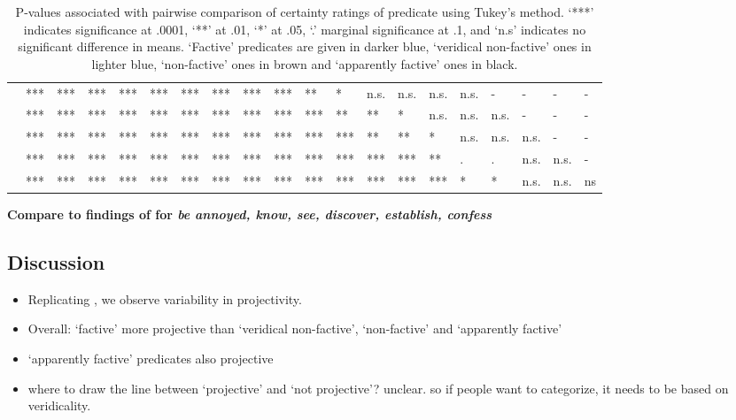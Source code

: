 \documentclass[11pt,fleqn]{article}
\newcommand{\6}{\mbox{$[\hspace*{-.6mm}[$}}
\newcommand{\9}{\mbox{$]\hspace*{-.6mm}]$}}
\begin{document}
\begin{table}[H]
\begin{tabular}{l l l l l l l l l l l l l l l l l l l l }
\color{blue}{\em hear}\color{black}		& *** & *** & *** & *** & *** & *** & *** & *** & *** & ** & * & n.s. & n.s. & n.s. & n.s. & - & - & - & - \\
\color{blue}{\em see}\color{black}			& *** & *** & *** & *** & *** & *** & *** & *** & *** & *** & ** & ** & * & n.s. & n.s. & n.s. & - & - & - \\
\color{black}{\em inform}\color{black}			& *** & *** & *** & *** & *** & *** & *** & *** & *** & *** & *** & ** & ** & * & n.s. & n.s. & n.s. & - & - \\
\color{blue}{\em know}\color{black}			& *** & *** & *** & *** & *** & *** & *** & *** & *** & *** & *** & *** & *** & ** & . & . & n.s. & n.s. & -  \\
\color{blue}{\em be annoyed}\color{black}		& *** & *** & *** & *** & *** & *** & *** & *** & ***  & ***  & *** & *** & *** & *** & * & * & n.s. & n.s. & ns  \\

\bottomrule
\end{tabular}
\caption{P-values associated with pairwise comparison of certainty ratings of predicate using Tukey's method. `***' indicates significance at .0001, `**' at .01, `*' at .05, `.' marginal significance at .1, and `n.s' indicates no significant difference in means. `Factive' predicates are given in darker blue, `veridical non-factive' ones in lighter blue, `non-factive' ones in brown and `apparently factive' ones in black.}\label{t-pairwise-proj}
\end{table}

{\bf Compare to findings of \citealt{tbd-variability} for {\em be annoyed, know, see, discover, establish, confess}}

\subsection{Discussion}

\begin{itemize}

\item Replicating \citealt{tbd-variability}, we observe variability in projectivity.

\item Overall: `factive' more projective than `veridical non-factive', `non-factive' and `apparently factive' 

\item `apparently factive' predicates also projective

\item where to draw the line between `projective' and `not projective'? unclear. so if people want to categorize, it needs to be based on veridicality.

\end{itemize}
\end{document}
